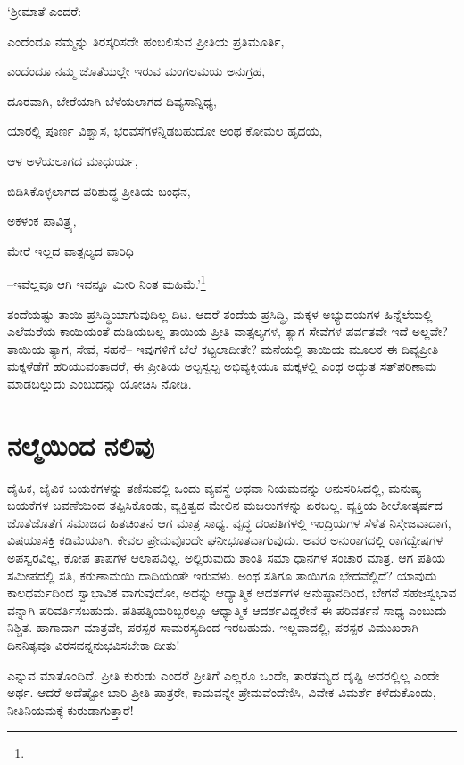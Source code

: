 ‘ಶ‍್ರೀಮಾತೆ ಎಂದರೆ:

ಎಂದೆಂದೂ ನಮ್ಮನ್ನು ತಿರಸ್ಕರಿಸದೇ ಹಂಬಲಿಸುವ ಪ್ರೀತಿಯ ಪ್ರತಿಮೂರ್ತಿ,

ಎಂದೆಂದೂ ನಮ್ಮ ಜೊತೆಯಲ್ಲೇ ಇರುವ ಮಂಗಲಮಯ ಅನುಗ್ರಹ,

ದೂರವಾಗಿ, ಬೇರೆಯಾಗಿ ಬೆಳೆಯಲಾಗದ ದಿವ್ಯಸಾನ್ನಿಧ್ಯ,

ಯಾರಲ್ಲಿ ಪೂರ್ಣ ವಿಶ್ವಾಸ, ಭರವಸೆಗಳನ್ನಿಡಬಹುದೋ ಅಂಥ ಕೋಮಲ ಹೃದಯ,

ಆಳ ಅಳೆಯಲಾಗದ ಮಾಧುರ್ಯ,

ಬಿಡಿಸಿಕೊಳ್ಳಲಾಗದ ಪರಿಶುದ್ಧ ಪ್ರೀತಿಯ ಬಂಧನ,

ಅಕಳಂಕ ಪಾವಿತ್ರ್ಯ,

ಮೇರೆ ಇಲ್ಲದ ವಾತ್ಸಲ್ಯದ ವಾರಿಧಿ

–ಇವೆಲ್ಲವೂ ಆಗಿ ಇವನ್ನೂ ಮೀರಿ ನಿಂತ ಮಹಿಮೆ.’\footnote{\hfill{}}

ತಂದೆಯಷ್ಟು ತಾಯಿ ಪ್ರಸಿದ್ಧಿಯಾಗುವುದಿಲ್ಲ ದಿಟ. ಆದರೆ ತಂದೆಯ ಪ್ರಸಿದ್ಧಿ, ಮಕ್ಕಳ ಅಭ್ಯುದಯಗಳ ಹಿನ್ನೆಲೆಯಲ್ಲಿ ಎಲೆಮರೆಯ ಕಾಯಿಯಂತೆ ದುಡಿಯಬಲ್ಲ ತಾಯಿಯ ಪ್ರೀತಿ ವಾತ್ಸಲ್ಯಗಳ, ತ್ಯಾಗ ಸೇವೆಗಳ ಪರ್ವತವೇ ಇದೆ ಅಲ್ಲವೇ? ತಾಯಿಯ ತ್ಯಾಗ, ಸೇವೆ, ಸಹನೆ– ಇವುಗಳಿಗೆ ಬೆಲೆ ಕಟ್ಟಲಾದೀತೇ? ಮನೆಯಲ್ಲಿ ತಾಯಿಯ ಮೂಲಕ ಈ ದಿವ್ಯಪ್ರೀತಿ ಮಕ್ಕಳೆಡೆಗೆ ಹರಿಯುವಂತಾದರೆ, ಈ ಪ್ರೀತಿಯ ಅಲ್ಪಸ್ವಲ್ಪ ಅಭಿವ್ಯಕ್ತಿಯೂ ಮಕ್ಕಳಲ್ಲಿ ಎಂಥ ಅದ್ಭುತ ಸತ್​ಪರಿಣಾಮ ಮಾಡಬಲ್ಲುದು ಎಂಬುದನ್ನು ಯೋಚಿಸಿ ನೋಡಿ.


\section{ನಲ್ಮೆಯಿಂದ ನಲಿವು}

ದೈಹಿಕ, ಜೈವಿಕ ಬಯಕೆಗಳನ್ನು ತಣಿಸುವಲ್ಲಿ ಒಂದು ವ್ಯವಸ್ಥೆ ಅಥವಾ ನಿಯಮವನ್ನು ಅನುಸರಿಸಿದಲ್ಲಿ, ಮನುಷ್ಯ ಬಯಕೆಗಳ ಬವಣೆಯಿಂದ ತಪ್ಪಿಸಿಕೊಂಡು, ವ್ಯಕ್ತಿತ್ವದ ಮೇಲಿನ ಮಜಲುಗಳನ್ನು ಏರಬಲ್ಲ. ವ್ಯಕ್ತಿಯ ಶೀಲೋತ್ಕರ್ಷದ ಜೊತೆಜೊತೆಗೆ ಸಮಾಜದ ಹಿತಚಿಂತನೆ ಆಗ ಮಾತ್ರ ಸಾಧ್ಯ. ವೃದ್ಧ ದಂಪತಿಗಳಲ್ಲಿ ಇಂದ್ರಿಯಗಳ ಸೆಳೆತ ನಿಸ್ತೇಜವಾದಾಗ, ವಿಷಯಾಸಕ್ತಿ ಕಡಿಮೆಯಾಗಿ, ಕೇವಲ ಪ್ರೇಮವೊಂದೇ ಘನೀಭೂತವಾಗುವುದು. ಅವರ ಅನುರಾಗದಲ್ಲಿ ರಾಗದ್ವೇಷಗಳ ಅಪಸ್ವರವಿಲ್ಲ, ಕೋಪ ತಾಪಗಳ ಆಲಾಪವಿಲ್ಲ. ಅಲ್ಲಿರುವುದು ಶಾಂತಿ ಸಮಾ ಧಾನಗಳ ಸಂಚಾರ ಮಾತ್ರ. ಆಗ ಪತಿಯ ಸಮೀಪದಲ್ಲಿ ಸತಿ, ಕರುಣಾಮಯಿ ದಾದಿಯಂತೇ ಇರುವಳು. ಅಂಥ ಸತಿಗೂ ತಾಯಿಗೂ ಭೇದವೆಲ್ಲಿದೆ? ಯಾವುದು ಕಾಲಧರ್ಮದಿಂದ ಸ್ವಾಭಾವಿಕ ವಾಗುವುದೋ, ಅದನ್ನು ಆಧ್ಯಾತ್ಮಿಕ ಆದರ್ಶಗಳ ಅನುಷ್ಠಾನದಿಂದ, ಬೇಗನೆ ಸಹಜಸ್ವಭಾವ ವನ್ನಾಗಿ ಪರಿವರ್ತಿಸಬಹುದು. ಪತಿಪತ್ನಿಯರಿಬ್ಬರಲ್ಲೂ ಆಧ್ಯಾತ್ಮಿಕ ಆದರ್ಶವಿದ್ದರೇನೆ ಈ ಪರಿವರ್ತನೆ ಸಾಧ್ಯ ಎಂಬುದು ನಿಶ್ಚಿತ. ಹಾಗಾದಾಗ ಮಾತ್ರವೇ, ಪರಸ್ಪರ ಸಾಮರಸ್ಯದಿಂದ ಇರಬಹುದು. ಇಲ್ಲವಾದಲ್ಲಿ, ಪರಸ್ಪರ ವಿಮುಖರಾಗಿ ದಿನನಿತ್ಯವೂ ವಿರಸವನ್ನನುಭವಿಸಬೇಕಾ ದೀತು!

ಎನ್ನುವ ಮಾತೊಂದಿದೆ. ಪ್ರೀತಿ ಕುರುಡು ಎಂದರೆ ಪ್ರೀತಿಗೆ ಎಲ್ಲರೂ ಒಂದೇ, ತಾರತಮ್ಯದ ದೃಷ್ಟಿ ಅದರಲ್ಲಿಲ್ಲ ಎಂದೇ ಅರ್ಥ. ಆದರೆ ಅದೆಷ್ಟೋ ಬಾರಿ ಪ್ರೀತಿ ಪಾತ್ರರೇ, ಕಾಮವನ್ನೇ ಪ್ರೇಮವೆಂದೆಣಿಸಿ, ವಿವೇಕ ವಿಮರ್ಶೆ ಕಳೆದುಕೊಂಡು, ನೀತಿನಿಯಮಕ್ಕೆ ಕುರುಡಾಗುತ್ತಾರೆ!

